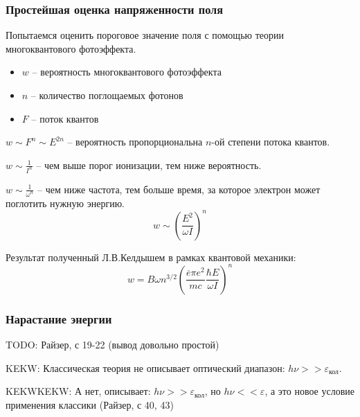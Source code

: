 \documentclass{beamer}
\begin{document}
	\begin{frame}
		\frametitle{Простейшая оценка напряженности поля}
		\footnotesize
		Попытаемся оценить пороговое значение поля с помощью теории многоквантового фотоэффекта.
		\begin{itemize}
			\setlength\itemsep{-2pt}
			\item $w$ -- вероятность многоквантового фотоэффекта
			\item $n$ -- количество поглощаемых фотонов
			\item $F$ -- поток квантов
		\end{itemize}
		
		$w \sim F^n \sim E^{2n}$ -- вероятность пропорциональна $n$-ой степени потока квантов.
		
		$w \sim \frac{1}{I^n}$ -- чем выше порог ионизации, тем ниже вероятность.
		
		$w \sim \frac{1}{\omega^n}$ -- чем ниже частота, тем больше время, за которое электрон может поглотить нужную энергию.
		$$ w \sim \left(\frac{E^2}{\omega I}\right)^n$$

		Результат полученный Л.В.Келдышем в рамках квантовой механики:
		$$ w = B \omega n^{3/2} \left(\frac{\overline{e} \pi e^2}{mc} \frac{\hbar E}{\omega I}\right)^n$$
		

	\end{frame}

	
	\begin{frame}
		\frametitle{Нарастание энергии}
		
		TODO: Райзер, с 19-22 (вывод довольно простой)
		
		KEKW: Классическая теория не описывает оптический диапазон: $h\nu >> \varepsilon_{\text{кол}}$.
		
		KEKWKEKW: А нет, описывает: $ h \nu >> \varepsilon_{\text{кол}}$, но $h\nu << \varepsilon$, а это новое условие применения классики (Райзер, с 40, 43)
	\end{frame}
	
\end{document}
